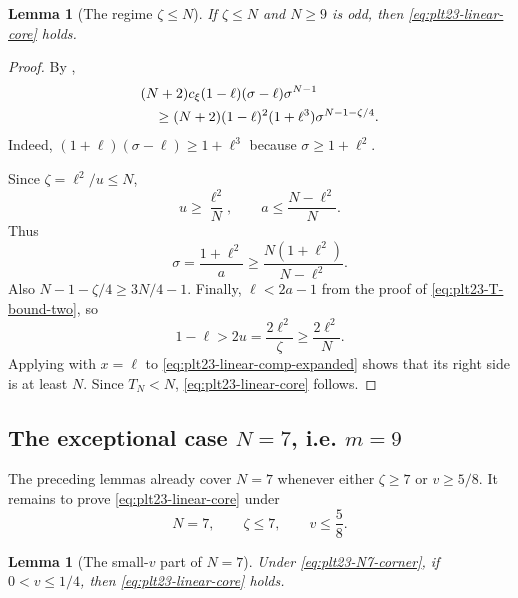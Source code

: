 \documentclass[11pt]{article}
\newtheorem{lemma}[theorem]{Lemma}
\numberwithin{equation}{section}
\begin{document}
\begin{lemma}[The regime $\zeta\le N$]\label{lem:plt23-linear-low-zeta}
  If $\zeta\le N$ and $N\ge9$ is odd, then \eqref{eq:plt23-linear-core} holds.
\end{lemma}

\begin{proof}
  By ,
  \begin{align}
    &(N+2)c_\xi(1-\ell)(\sigma-\ell)\sigma^{N-1}\notag\\
    &\quad\ge
    (N+2)(1-\ell)^2(1+\ell^3)
    \sigma^{N-1-\zeta/4}.
    \label{eq:plt23-linear-comp-expanded}
  \end{align}
  Indeed, $(1+\ell)(\sigma-\ell)\ge1+\ell^3$ because $\sigma\ge1+\ell^2$.

  Since $\zeta=\ell^2/u\le N$,
  \[
    u\ge\frac{\ell^2}{N},
    \qquad
    a\le\frac{N-\ell^2}{N}.
  \]
  Thus
  \begin{equation}\label{eq:plt23-sigma-lower-J}
    \sigma=\frac{1+\ell^2}{a}
    \ge\frac{N(1+\ell^2)}{N-\ell^2}.
  \end{equation}
  Also $N-1-\zeta/4\ge3N/4-1$.
  Finally, $\ell<2a-1$ from the proof of \eqref{eq:plt23-T-bound-two}, so
  \[
    1-\ell>2u=\frac{2\ell^2}{\zeta}
    \ge\frac{2\ell^2}{N}.
  \]
  Applying  with $x=\ell$ to \eqref{eq:plt23-linear-comp-expanded} shows that its right side is at least $N$.
  Since $T_N<N$, \eqref{eq:plt23-linear-core} follows.
\end{proof}

\subsection{The exceptional case \texorpdfstring{$N=7$, i.e. $m=9$}{N=7, i.e. m=9}}

The preceding lemmas already cover $N=7$ whenever either $\zeta\ge7$ or $v\ge5/8$.
It remains to prove \eqref{eq:plt23-linear-core} under
\begin{equation}\label{eq:plt23-N7-corner}
  N=7,
  \qquad \zeta\le7,
  \qquad v\le\frac{5}{8}.
\end{equation}

\begin{lemma}[The small-$v$ part of $N=7$]\label{lem:plt23-N7-small-v}
  Under \eqref{eq:plt23-N7-corner}, if $0<v\le1/4$, then \eqref{eq:plt23-linear-core} holds.
\end{lemma}
\end{document}
